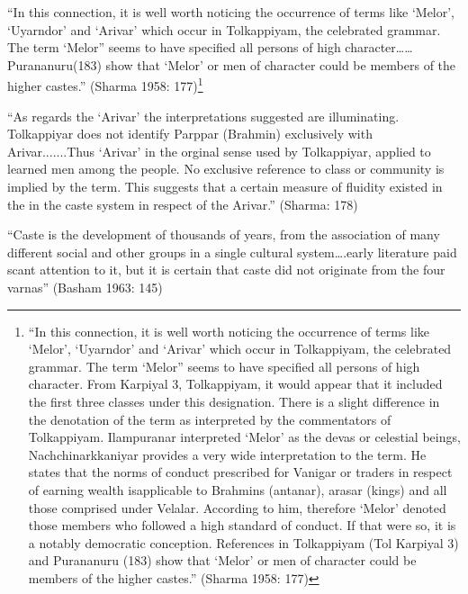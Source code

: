 \begin{myquote}
“In this connection, it is well worth noticing the occurrence of terms like ‘Melor’, ‘Uyarndor’ and ‘Arivar’ which occur in Tolkappiyam, the celebrated grammar. The term ‘Melor” seems to have specified all persons of high character……Purananuru(183) show that ‘Melor’ or men of character could be members of the higher castes.” (Sharma 1958: 177)\footnote{“In this connection, it is well worth noticing the occurrence of terms like ‘Melor’, ‘Uyarndor’ and ‘Arivar’ which occur in Tolkappiyam, the celebrated grammar. The term ‘Melor” seems to have specified all persons of high character. From Karpiyal 3, Tolkappiyam, it would appear that it included the first three classes under this designation. There is a slight difference in the denotation of the term as interpreted by the commentators of Tolkappiyam. Ilampuranar interpreted ‘Melor’ as the devas or celestial beings, Nachchinarkkaniyar provides a very wide interpretation to the term. He states that the norms of conduct prescribed for Vanigar or traders in respect of earning wealth isapplicable to Brahmins (antanar), arasar (kings) and all those comprised under Velalar. According to him, therefore ‘Melor’ denoted those members who followed a high standard of conduct. If that were so, it is a notably democratic conception. References in Tolkappiyam (Tol Karpiyal 3) and Purananuru (183) show that ‘Melor’ or men of character could be members of the higher castes.” (Sharma 1958: 177)}
\end{myquote}

\vskip 2pt

\begin{myquote}
“As regards the ‘Arivar’ the interpretations suggested are illuminating. Tolkappiyar does not identify Parppar (Brahmin) exclusively with Arivar.......Thus ‘Arivar’ in the orginal sense used by Tolkappiyar, applied to learned men among the people. No exclusive reference to class or community is implied by the term. This suggests that a certain measure of fluidity existed in the in the caste system in respect of the Arivar.” (Sharma: 178)
\end{myquote}

\vskip 2pt

\begin{myquote}
“Caste is the development of thousands of years, from the association of many different social and other groups in a single cultural system….early literature paid scant attention to it, but it is certain that caste did not originate from the four varnas” (Basham 1963: 145)
\end{myquote}


